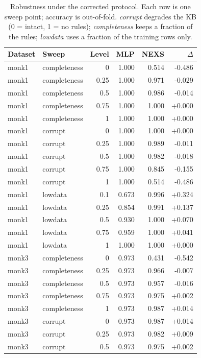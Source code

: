 \begin{table}[t]\centering
\small
\caption{Robustness under the corrected protocol. Each row is one sweep point; accuracy is out-of-fold. \emph{corrupt} degrades the KB (0 = intact, 1 = no rules); \emph{completeness} keeps a fraction of the rules; \emph{lowdata} uses a fraction of the training rows only.}
\label{tab:robustness}
\begin{tabular}{llrrrr}
\toprule
Dataset & Sweep & Level & MLP & NEXS & $\Delta$ \\
\midrule
monk1 & completeness & 0 & 1.000 & 0.514 & -0.486 \\
monk1 & completeness & 0.25 & 1.000 & 0.971 & -0.029 \\
monk1 & completeness & 0.5 & 1.000 & 0.986 & -0.014 \\
monk1 & completeness & 0.75 & 1.000 & 1.000 & +0.000 \\
monk1 & completeness & 1 & 1.000 & 1.000 & +0.000 \\
monk1 & corrupt & 0 & 1.000 & 1.000 & +0.000 \\
monk1 & corrupt & 0.25 & 1.000 & 0.989 & -0.011 \\
monk1 & corrupt & 0.5 & 1.000 & 0.982 & -0.018 \\
monk1 & corrupt & 0.75 & 1.000 & 0.845 & -0.155 \\
monk1 & corrupt & 1 & 1.000 & 0.514 & -0.486 \\
monk1 & lowdata & 0.1 & 0.673 & 0.996 & +0.324 \\
monk1 & lowdata & 0.25 & 0.854 & 0.991 & +0.137 \\
monk1 & lowdata & 0.5 & 0.930 & 1.000 & +0.070 \\
monk1 & lowdata & 0.75 & 0.959 & 1.000 & +0.041 \\
monk1 & lowdata & 1 & 1.000 & 1.000 & +0.000 \\
monk3 & completeness & 0 & 0.973 & 0.431 & -0.542 \\
monk3 & completeness & 0.25 & 0.973 & 0.966 & -0.007 \\
monk3 & completeness & 0.5 & 0.973 & 0.957 & -0.016 \\
monk3 & completeness & 0.75 & 0.973 & 0.975 & +0.002 \\
monk3 & completeness & 1 & 0.973 & 0.987 & +0.014 \\
monk3 & corrupt & 0 & 0.973 & 0.987 & +0.014 \\
monk3 & corrupt & 0.25 & 0.973 & 0.982 & +0.009 \\
monk3 & corrupt & 0.5 & 0.973 & 0.975 & +0.002 \\

\end{tabular}
\end{table}
